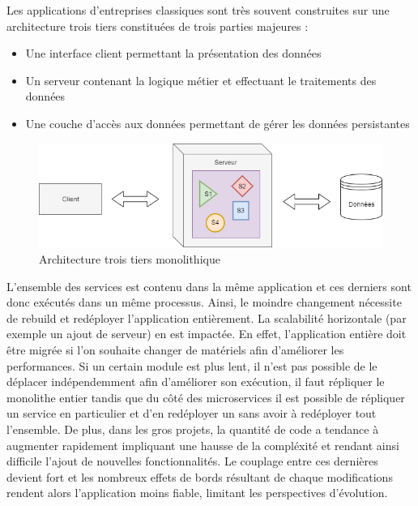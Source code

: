 	Les applications d'entreprises classiques sont très souvent construites sur une architecture trois tiers constituées de trois parties majeures :
	\begin{itemize}
		\item Une interface client permettant la présentation des données
		\item Un serveur contenant la logique métier et effectuant le traitements des données
		\item Une couche d'accès aux données permettant de gérer les données persistantes \\
	\end{itemize}
	
\begin{figure}[h!]
	\includegraphics[scale=0.5]{images/travailNeuflizeOBC/architecture/troisTiers.png}
	\centering
	\caption{Architecture trois tiers monolithique}
	\label{troisTiers}
\end{figure}
	
	L'ensemble des services est contenu dans la même application et ces derniers sont donc exécutés dans un même processus. Ainsi, le moindre changement nécessite de rebuild et redéployer l'application entièrement. La scalabilité horizontale (par exemple un ajout de serveur) en est impactée. En effet, l'application entière doit être migrée si l'on souhaite changer de matériels afin d'améliorer les performances. Si un certain module est plus lent, il n'est pas possible de le déplacer indépendemment afin d'améliorer son exécution, il faut répliquer le monolithe entier tandis que du côté des microservices il est possible de répliquer un service en particulier et d'en redéployer un sans avoir à redéployer tout l'ensemble. De plus, dans les gros projets, la quantité de code a tendance à augmenter rapidement impliquant une hausse de la compléxité et rendant ainsi difficile l'ajout de nouvelles fonctionnalités. Le couplage entre ces dernières devient fort et les nombreux effets de bords résultant de chaque modifications rendent alors l'application moins fiable, limitant les perspectives d'évolution.

